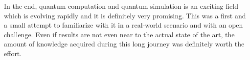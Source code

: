 In the end, quantum computation and quantum simulation is an exciting field which is evolving rapidly and it is definitely very promising. This was a first and a small attempt to familiarize with it in a real-world scenario and with an open challenge. Even if results are not even near to the actual state of the art, the amount of knowledge acquired during this long journey was definitely worth the effort. 

